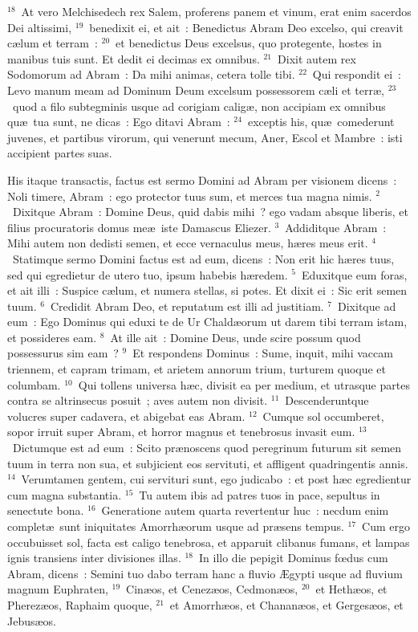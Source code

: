 ${}^{18}$~At vero Melchisedech rex Salem, proferens panem et vinum, erat enim sacerdos Dei altissimi,
${}^{19}$~benedixit ei, et ait~: Benedictus Abram Deo excelso, qui creavit c\ae lum et terram~:
${}^{20}$~et benedictus Deus excelsus, quo protegente, hostes in manibus tuis sunt. Et dedit ei decimas ex omnibus.
${}^{21}$~Dixit autem rex Sodomorum ad Abram~: Da mihi animas, cetera tolle tibi.
${}^{22}$~Qui respondit ei~: Levo manum meam ad Dominum Deum excelsum possessorem c\ae li et terr\ae ,
${}^{23}$~quod a filo subtegminis usque ad corigiam calig\ae , non accipiam ex omnibus qu\ae\ tua sunt, ne dicas~: Ego ditavi Abram~:
${}^{24}$~exceptis his, qu\ae\ comederunt juvenes, et partibus virorum, qui venerunt mecum, Aner, Escol et Mambre~: isti accipient partes suas.

\lettrine[lines=3,image=true,loversize=0.05,lraise=-0.03]{H}{}is itaque transactis, factus est sermo Domini ad Abram per visionem dicens~: Noli timere, Abram~: ego protector tuus sum, et merces tua magna nimis.
${}^{2}$~Dixitque Abram~: Domine Deus, quid dabis mihi~? ego vadam absque liberis, et filius procuratoris domus me\ae\ iste Damascus Eliezer.
${}^{3}$~Addiditque Abram~: Mihi autem non dedisti semen, et ecce vernaculus meus, h\ae res meus erit.
${}^{4}$~Statimque sermo Domini factus est ad eum, dicens~: Non erit hic h\ae res tuus, sed qui egredietur de utero tuo, ipsum habebis h\ae redem.
${}^{5}$~Eduxitque eum foras, et ait illi~: Suspice c\ae lum, et numera stellas, si potes. Et dixit ei~: Sic erit semen tuum.
${}^{6}$~Credidit Abram Deo, et reputatum est illi ad justitiam.
${}^{7}$~Dixitque ad eum~: Ego Dominus qui eduxi te de Ur Chald\ae orum ut darem tibi terram istam, et possideres eam.
${}^{8}$~At ille ait~: Domine Deus, unde scire possum quod possessurus sim eam~?
${}^{9}$~Et respondens Dominus~: Sume, inquit, mihi vaccam triennem, et capram trimam, et arietem annorum trium, turturem quoque et columbam.
${}^{10}$~Qui tollens universa h\ae c, divisit ea per medium, et utrasque partes contra se altrinsecus posuit~; aves autem non divisit.
${}^{11}$~Descenderuntque volucres super cadavera, et abigebat eas Abram.
${}^{12}$~Cumque sol occumberet, sopor irruit super Abram, et horror magnus et tenebrosus invasit eum.
${}^{13}$~Dictumque est ad eum~: Scito pr\ae noscens quod peregrinum futurum sit semen tuum in terra non sua, et subjicient eos servituti, et affligent quadringentis annis.
${}^{14}$~Verumtamen gentem, cui servituri sunt, ego judicabo~: et post h\ae c egredientur cum magna substantia.
${}^{15}$~Tu autem ibis ad patres tuos in pace, sepultus in senectute bona.
${}^{16}$~Generatione autem quarta revertentur huc~: necdum enim complet\ae\ sunt iniquitates Amorrh\ae orum usque ad pr\ae sens tempus.
${}^{17}$~Cum ergo occubuisset sol, facta est caligo tenebrosa, et apparuit clibanus fumans, et lampas ignis transiens inter divisiones illas.
${}^{18}$~In illo die pepigit Dominus fœdus cum Abram, dicens~: Semini tuo dabo terram hanc a fluvio \AE gypti usque ad fluvium magnum Euphraten,
${}^{19}$~Cin\ae os, et Cenez\ae os, Cedmon\ae os,
${}^{20}$~et Heth\ae os, et Pherez\ae os, Raphaim quoque,
${}^{21}$~et Amorrh\ae os, et Chanan\ae os, et Gerges\ae os, et Jebus\ae os.

